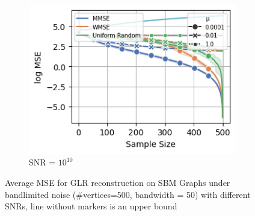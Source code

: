 \begin{figure}
\begin{subfigure}{0.3\columnwidth}
    \end{subfigure}\hfill%
    \begin{subfigure}{0.3\columnwidth}
    \includegraphics[width=\columnwidth]{figures/proj1/plots/GLR_MSE/SBM_500_bandwidth_50_SNRdbs_100.0_samps_500_mus_0.0001_0.01_1_bl_noise.png}
    \caption{SNR = $10^{10}$}%
    \label{bandlimited_GLR_SBM_MSE_subfigc}%
    \end{subfigure}%
    \caption{\color{black}Average MSE for GLR reconstruction on SBM Graphs under bandlimited noise (\#vertices=500, bandwidth = 50) with different SNRs, line without markers is an upper bound}
\label{bandlimited_GLR_SBM_MSE_fig}
\end{figure}




